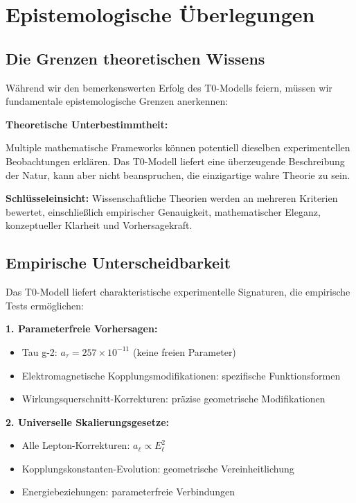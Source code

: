 \documentclass[12pt,a4paper]{report}
\begin{document}
	\section{Epistemologische Überlegungen}
	\label{sec:epistemological_considerations}
	
	\subsection{Die Grenzen theoretischen Wissens}
	\label{subsec:limits_theoretical_knowledge}
	
	Während wir den bemerkenswerten Erfolg des T0-Modells feiern, müssen wir fundamentale epistemologische Grenzen anerkennen:
	
	\begin{tcolorbox}[colback=yellow!5!white,colframe=orange!75!black,title=Epistemologische Bescheidenheit]
		\textbf{Theoretische Unterbestimmtheit:}
		
		Multiple mathematische Frameworks können potentiell dieselben experimentellen Beobachtungen erklären. Das T0-Modell liefert eine überzeugende Beschreibung der Natur, kann aber nicht beanspruchen, die einzigartige wahre Theorie zu sein.
		
		\textbf{Schlüsseleinsicht:} Wissenschaftliche Theorien werden an mehreren Kriterien bewertet, einschließlich empirischer Genauigkeit, mathematischer Eleganz, konzeptueller Klarheit und Vorhersagekraft.
	\end{tcolorbox}
	
	\subsection{Empirische Unterscheidbarkeit}
	\label{subsec:empirical_distinguishability}
	
	Das T0-Modell liefert charakteristische experimentelle Signaturen, die empirische Tests ermöglichen:
	
	\textbf{1. Parameterfreie Vorhersagen:}
	\begin{itemize}
		\item Tau g-2: $a_\tau = 257 \times 10^{-11}$ (keine freien Parameter)
		\item Elektromagnetische Kopplungsmodifikationen: spezifische Funktionsformen
		\item Wirkungsquerschnitt-Korrekturen: präzise geometrische Modifikationen
	\end{itemize}
	
	\textbf{2. Universelle Skalierungsgesetze:}
	\begin{itemize}
		\item Alle Lepton-Korrekturen: $a_\ell \propto E_\ell^2$
		\item Kopplungskonstanten-Evolution: geometrische Vereinheitlichung
		\item Energiebeziehungen: parameterfreie Verbindungen
	\end{itemize}
	
\end{document}
